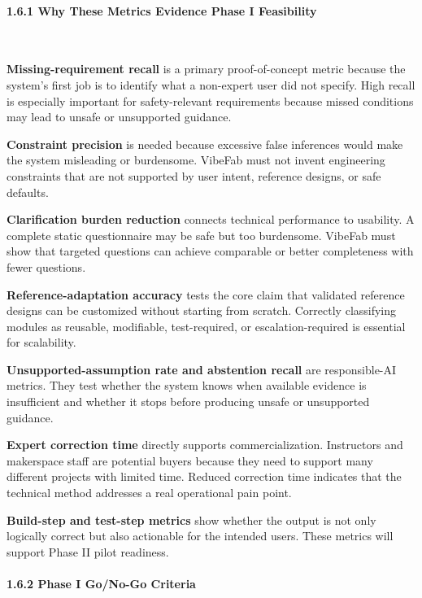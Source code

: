 \paragraph{1.6.1 Why These Metrics Evidence Phase I Feasibility}~{}

\textbf{Missing-requirement recall} is a primary proof-of-concept metric because the system's first job is to identify what a non-expert user did not specify. High recall is especially important for safety-relevant requirements because missed conditions may lead to unsafe or unsupported guidance.

\textbf{Constraint precision} is needed because excessive false inferences would make the system misleading or burdensome. VibeFab must not invent engineering constraints that are not supported by user intent, reference designs, or safe defaults.

\textbf{Clarification burden reduction} connects technical performance to usability. A complete static questionnaire may be safe but too burdensome. VibeFab must show that targeted questions can achieve comparable or better completeness with fewer questions.

\textbf{Reference-adaptation accuracy} tests the core claim that validated reference designs can be customized without starting from scratch. Correctly classifying modules as reusable, modifiable, test-required, or escalation-required is essential for scalability.

\textbf{Unsupported-assumption rate and abstention recall} are responsible-AI metrics. They test whether the system knows when available evidence is insufficient and whether it stops before producing unsafe or unsupported guidance.

\textbf{Expert correction time} directly supports commercialization. Instructors and makerspace staff are potential buyers because they need to support many different projects with limited time. Reduced correction time indicates that the technical method addresses a real operational pain point.

\textbf{Build-step and test-step metrics} show whether the output is not only logically correct but also actionable for the intended users. These metrics will support Phase II pilot readiness.
\vspace{-10pt}
\paragraph{1.6.2 Phase I Go/No-Go Criteria}

